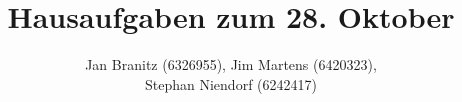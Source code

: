 \documentclass[10pt,a4paper,oneside,ngerman,numbers=noenddot]{scrartcl}
\begin{document}
\author{Jan Branitz (6326955), Jim Martens (6420323),\\
Stephan Niendorf (6242417)}
\title{Hausaufgaben zum 28. Oktober}
\maketitle
\section{} %
	\subsection{} %
	\subsection{} %
\section{} %
\end{document}
